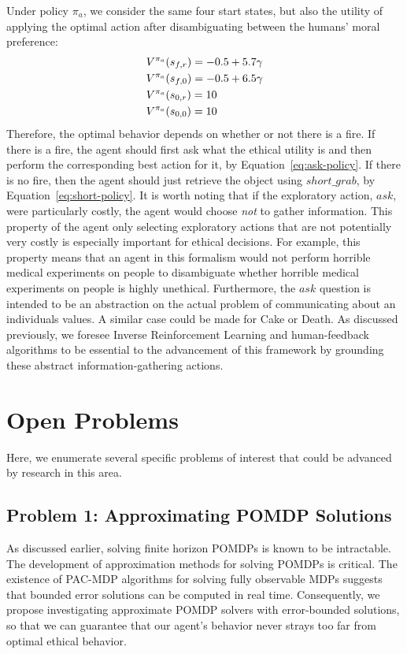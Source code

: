\documentclass[11pt]{article}
\begin{document}
Under policy $\pi_a$, we consider the same four start states, but also the utility of applying the optimal action after disambiguating between the humans' moral preference:
\begin{align}
&V^{\pi_a}(s_{f,r}) = -0.5 + 5.7 \gamma \notag\\
&V^{\pi_a}(s_{f,0}) = -0.5 + 6.5 \gamma \notag\\
&V^{\pi_a}(s_{0,r}) = 10 \notag\\
&V^{\pi_a}(s_{0,0}) = 10
\label{eq:ask-policy}
\end{align}
Therefore, the optimal behavior depends on whether or not there is a fire. If there is a fire, the agent should first ask what the ethical utility is and then perform the corresponding best action for it, by Equation~\ref{eq:ask-policy}. If there is no fire, then the agent should just retrieve the object using $short\_grab$, by Equation~\ref{eq:short-policy}. It is worth noting that if the exploratory action, $ask$, were particularly costly, the agent would choose {\it not} to gather information. This property of the agent only selecting exploratory actions that are not potentially very costly is especially important for ethical decisions. For example, this property means that an agent in this formalism would not perform horrible medical experiments on people to disambiguate whether horrible medical experiments on people is highly unethical. Furthermore, the $ask$ question is intended to be an abstraction on the actual problem of communicating about an individuals values. A similar case could be made for Cake or Death. As discussed previously, we foresee Inverse Reinforcement Learning and human-feedback algorithms to be essential to the advancement of this framework by grounding these abstract information-gathering actions.

\section{Open Problems}

Here, we enumerate several specific problems of interest that could be advanced by research in this area.

\subsection{Problem 1: Approximating POMDP Solutions}  As discussed earlier, solving finite horizon POMDPs is known to be intractable. The development of approximation methods for solving POMDPs is critical. The existence of PAC-MDP algorithms for solving fully observable MDPs suggests that bounded error solutions can be computed in real time. Consequently, we propose investigating approximate POMDP solvers with error-bounded solutions, so that we can guarantee that our agent's behavior never strays too far from optimal ethical behavior.
\end{document}
